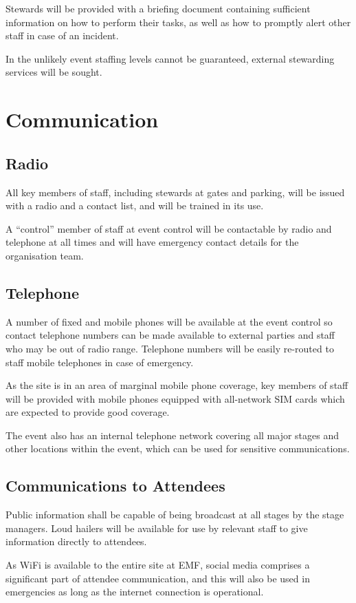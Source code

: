 Stewards will be provided with a briefing document containing sufficient information on how to perform
their tasks, as well as how to promptly alert other staff in case of an incident.

In the unlikely event staffing levels cannot be guaranteed, external stewarding services will be sought.

\section{Communication}

\subsection{Radio}
All key members of staff, including stewards at gates and parking,
will be issued with a radio and a contact list, and will be trained in its use.

A ``control'' member of staff at event control will be contactable by
radio and telephone at all times and will have emergency contact details for the
organisation team.

\subsection{Telephone}
A number of fixed and mobile phones will be available at the event control so
contact telephone numbers can be made available to external parties and staff
who may be out of radio range. Telephone numbers will be easily re-routed to
staff mobile telephones in case of emergency.

As the site is in an area of marginal mobile phone coverage, key members of staff
will be provided with mobile phones equipped with all-network SIM cards which
are expected to provide good coverage.

The event also has an internal telephone network covering all major stages and
other locations within the event, which can be used for sensitive
communications.

\subsection{Communications to Attendees}\label{attendeecomms}
Public information shall be capable of being broadcast at all stages by the
stage managers. Loud hailers will be available for use by relevant staff to
give information directly to attendees.

As WiFi is available to the entire site at EMF, social media comprises a
significant part of attendee communication, and this will also be used in
emergencies as long as the internet connection is operational.


